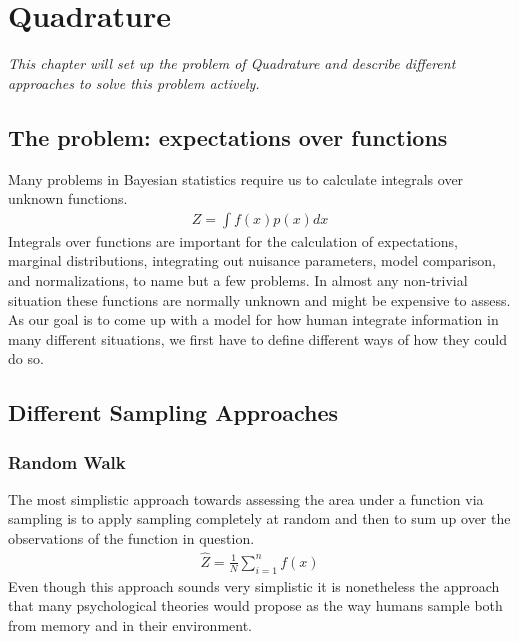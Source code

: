 \documentclass[oneside, 11pt]{book}
\begin{document}
\chapter{Quadrature}
\emph{This chapter will set up the problem of Quadrature and describe different approaches to solve this problem actively.}

\section{The problem: expectations over functions}
Many problems in Bayesian statistics require us to calculate integrals over unknown functions.
\begin{align}
Z=\int f(x)p(x) dx
\end{align}
Integrals over functions are important for the calculation of expectations, marginal distributions, integrating out nuisance parameters, model comparison, and normalizations, to name but a few problems. In almost any non-trivial situation these functions are normally unknown and might be expensive to assess.\\
As our goal is to come up with a model for how human integrate information in many different situations, we first have to define different ways of how they could do so.
\section{Different Sampling Approaches}
\subsection{Random Walk}
The most simplistic approach towards assessing the area under a function via sampling is to apply sampling completely at random and then to sum up over the observations of the function in question.
\begin{align}
\hat{Z}=\frac{1}{N}\sum_{i=1}^nf(x)
\end{align}
Even though this approach sounds very simplistic it is nonetheless the approach that many psychological theories would propose as the way humans sample both from memory and in their environment.
\end{document}

